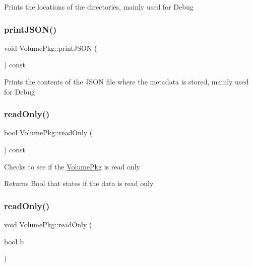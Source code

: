 Prints the locations of the directories, mainly used for Debug \hypertarget{classVolumePkg_ab4c4d6cb9715dbdde2e76f96115d94f9}{}\label{classVolumePkg_ab4c4d6cb9715dbdde2e76f96115d94f9} 
\subsubsection{\texorpdfstring{print\+J\+S\+O\+N()}{printJSON()}}
{\footnotesize\ttfamily void Volume\+Pkg\+::print\+J\+S\+ON (\begin{DoxyParamCaption}{ }\end{DoxyParamCaption}) const\hspace{0.3cm}{\ttfamily [inline]}}

Prints the contents of the J\+S\+ON file where the metadata is stored, mainly used for Debug \hypertarget{classVolumePkg_a1cf5ee88ba2392ab825619ef7890d7ae}{}\label{classVolumePkg_a1cf5ee88ba2392ab825619ef7890d7ae} 
\subsubsection{\texorpdfstring{read\+Only()}{readOnly()}\hspace{0.1cm}{\footnotesize\ttfamily [1/2]}}
{\footnotesize\ttfamily bool Volume\+Pkg\+::read\+Only (\begin{DoxyParamCaption}{ }\end{DoxyParamCaption}) const\hspace{0.3cm}{\ttfamily [inline]}}

Checks to see if the \hyperlink{classVolumePkg}{Volume\+Pkg} is read only \begin{DoxyReturn}{Returns}
Bool that states if the data is read only 
\end{DoxyReturn}
\hypertarget{classVolumePkg_a4dba1fc88e4390da1ad9fadf4c73b41b}{}\label{classVolumePkg_a4dba1fc88e4390da1ad9fadf4c73b41b} 
\subsubsection{\texorpdfstring{read\+Only()}{readOnly()}\hspace{0.1cm}{\footnotesize\ttfamily [2/2]}}
{\footnotesize\ttfamily void Volume\+Pkg\+::read\+Only (\begin{DoxyParamCaption}\item[{bool}]{b }\end{DoxyParamCaption})\hspace{0.3cm}{\ttfamily [inline]}}

